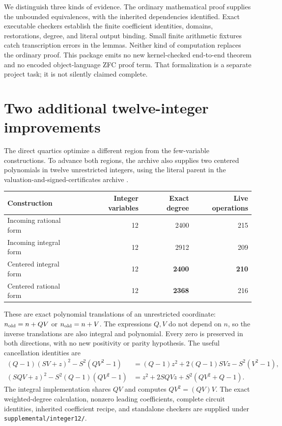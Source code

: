 \documentclass[10pt,letterpaper]{article}
\theoremstyle{remark}\newtheorem{remark}[theorem]{Remark}
\newcommand{\file}[1]{\texttt{\nolinkurl{#1}}}
\begin{document}
We distinguish three kinds of evidence. The ordinary mathematical proof
supplies the unbounded equivalences, with the inherited dependencies
identified. Exact executable checkers establish the finite coefficient
identities, domains, restorations, degree, and literal output binding.
Small finite arithmetic fixtures catch transcription errors in the
lemmas. Neither kind of computation replaces the ordinary proof.
This package emits no new kernel-checked end-to-end theorem and no
encoded object-language ZFC proof term. That formalization is a separate
project task; it is not silently claimed complete.

\section{Two additional twelve-integer improvements}
\label{sec:twelve}

The direct quartics optimize a different region from the few-variable
constructions. To advance both regions, the archive also supplies two
centered polynomials in twelve unrestricted integers, using the literal
parent in the valuation-and-signed-certificates archive \cite{valuation}.

\begin{center}\small
\begin{tabular}{lrrr}
\toprule
Construction & Integer variables & Exact degree & Live operations\\
\midrule
Incoming rational form & 12 & 2400 & 215\\
Incoming integral form & 12 & 2912 & 209\\
Centered integral form & 12 & \textbf{2400} & \textbf{210}\\
Centered rational form & 12 & \textbf{2368} & 216\\
\bottomrule
\end{tabular}
\end{center}

These are exact polynomial translations of an unrestricted coordinate:
$n_{\rm old}=n+QV$ or $n_{\rm old}=n+V$. The expressions $Q,V$ do not
depend on $n$, so the inverse translations are also integral and
polynomial. Every zero is preserved in both directions, with no new
positivity or parity hypothesis. The useful cancellation identities are
\begin{align*}
 (Q-1)(SV+z)^2-S^2(QV^2-1)
 &= (Q-1)z^2+2(Q-1)SVz-S^2(V^2-1),\\
 (SQV+z)^2-S^2(Q-1)(QV^2-1)
 &= z^2+2SQVz+S^2(QV^2+Q-1).
\end{align*}
The integral implementation shares $QV$ and computes $QV^2=(QV)V$.
The exact weighted-degree calculation, nonzero leading coefficients,
complete circuit identities, inherited coefficient recipe, and standalone
checkers are supplied under \file{supplemental/integer12/}.
\end{document}
